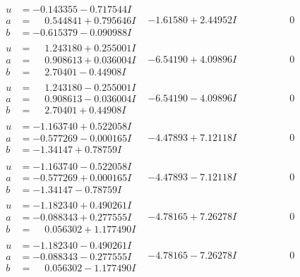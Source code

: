 \documentclass[1p]{elsarticle_modified}
\theoremstyle{definition}
\begin{document}
$$\begin{array}{c|c|c}
\begin{aligned}
u &= -0.143355 - 0.717544 I \\
a &= \phantom{-}0.544841 + 0.795646 I \\
b &= -0.615379 - 0.090988 I\end{aligned}
 & -1.61580 + 2.44952 I & \phantom{-0.000000 } 0 \\ \hline\begin{aligned}
u &= \phantom{-}1.243180 + 0.255001 I \\
a &= \phantom{-}0.908613 + 0.036004 I \\
b &= \phantom{-}2.70401 - 0.44908 I\end{aligned}
 & -6.54190 + 4.09896 I & \phantom{-0.000000 } 0 \\ \hline\begin{aligned}
u &= \phantom{-}1.243180 - 0.255001 I \\
a &= \phantom{-}0.908613 - 0.036004 I \\
b &= \phantom{-}2.70401 + 0.44908 I\end{aligned}
 & -6.54190 - 4.09896 I & \phantom{-0.000000 } 0 \\ \hline\begin{aligned}
u &= -1.163740 + 0.522058 I \\
a &= -0.577269 - 0.000165 I \\
b &= -1.34147 + 0.78759 I\end{aligned}
 & -4.47893 + 7.12118 I & \phantom{-0.000000 } 0 \\ \hline\begin{aligned}
u &= -1.163740 - 0.522058 I \\
a &= -0.577269 + 0.000165 I \\
b &= -1.34147 - 0.78759 I\end{aligned}
 & -4.47893 - 7.12118 I & \phantom{-0.000000 } 0 \\ \hline\begin{aligned}
u &= -1.182340 + 0.490261 I \\
a &= -0.088343 + 0.277555 I \\
b &= \phantom{-}0.056302 + 1.177490 I\end{aligned}
 & -4.78165 + 7.26278 I & \phantom{-0.000000 } 0 \\ \hline\begin{aligned}
u &= -1.182340 - 0.490261 I \\
a &= -0.088343 - 0.277555 I \\
b &= \phantom{-}0.056302 - 1.177490 I\end{aligned}
 & -4.78165 - 7.26278 I & \phantom{-0.000000 } 0\\

\end{array}$$
\end{document}

